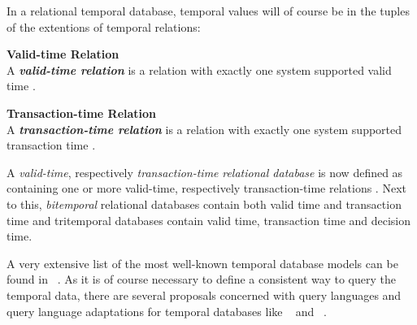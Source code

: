 In a relational temporal database, temporal values will of course be in the tuples of the extentions of temporal relations:

\begin{svgraybox}
\vspace{-10pt}
\begin{definition}\textbf{Valid-time Relation}\\
A \emph{\textbf{valid-time relation}} is a relation with exactly one system supported valid time \cite{Dyreson1994}.
\end{definition}

\begin{definition}\textbf{Transaction-time Relation}\\
A \emph{\textbf{transaction-time relation}} is a relation with exactly one system supported transaction time \cite{Dyreson1994}.
\end{definition}
\vspace{-10pt}
\end{svgraybox}

A \emph{valid-time}, respectively \emph{transaction-time} \emph{relational database} is now defined as containing one or more valid-time, respectively transaction-time relations \cite{Dyreson1994}. Next to this, \emph{bitemporal} relational databases contain both valid time and transaction time and tritemporal databases contain valid time, transaction time and decision time.




A very extensive list of the most well-known temporal database models can be found in ~\cite{Yu1998}. As it is of course necessary to define a consistent way to query the temporal data, there are several proposals concerned with query languages and query language adaptations for temporal databases like ~\cite{TSQL} and ~\cite{Snodgrass98}.






